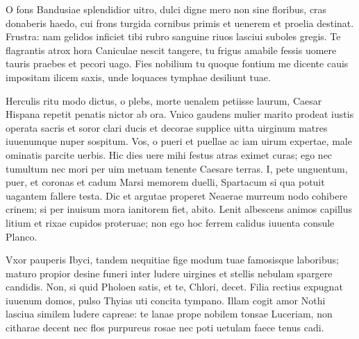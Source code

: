 \documentclass{book}
\newenvironment {carmen} [1] [\relax] 
  {\Titulus \Versus \incipit*\numerus{1}#1}
  {\endVersus}
\newcommand {\Sapphic}   {\Forma \strophae {0 \poena 00 \poena 1}}
\newcommand {\AsclB}     {\Forma \strophae {0 \poena 02 \poena 3}}
\newcommand {\GlycAscl}  {\Forma \strophae {2 \poena 0}}
\begin{document}
\begin{carmen}[\AsclB]


O fons Bandusiae splendidior uitro,
 dulci digne mero non sine floribus,
      cras donaberis haedo,
      cui frons turgida cornibus 
primis et uenerem et proelia destinat.               
 Frustra: nam gelidos inficiet tibi
      rubro sanguine riuos
      lasciui suboles gregis. 
Te flagrantis atrox hora Caniculae
 nescit tangere, tu frigus amabile               
      fessis uomere tauris
      praebes et pecori uago. 
Fies nobilium tu quoque fontium
 me dicente cauis impositam ilicem
      saxis, unde loquaces               
      tymphae desiliunt tuae. 

\end{carmen}

\begin{carmen}[\Sapphic]


Herculis ritu modo dictus, o plebs,
 morte uenalem petiisse laurum,
 Caesar Hispana repetit penatis
      nictor ab ora. 
Vnico gaudens mulier marito               
 prodeat iustis operata sacris
 et soror clari ducis et decorae
      supplice uitta 
uirginum matres iuuenumque nuper
 sospitum. Vos, o pueri et puellae ac               
 iam uirum expertae, male ominatis
      parcite uerbis. 
Hic dies uere mihi festus atras
 eximet curas; ego nec tumultum
 nec mori per uim metuam tenente               
      Caesare terras. 
I, pete unguentum, puer, et coronas
 et cadum Marsi memorem duelli,
 Spartacum si qua potuit uagantem
      fallere testa.                
Dic et argutae properet Neaerae
 murreum nodo cohibere crinem;
 si per inuisum mora ianitorem
      fiet, abito. 
Lenit albescens animos capillus               
 litium et rixae cupidos proteruae;
 non ego hoc ferrem calidus iuuenta
      consule Planco. 

\end{carmen}

\begin{carmen}[\GlycAscl]


     Vxor pauperis Ibyci,
 tandem nequitiae fige modum tuae
      famosisque laboribus;
 maturo propior desine funeri
      inter ludere uirgines               
 et stellis nebulam spargere candidis.
      Non, si quid Pholoen satis,
 et te, Chlori, decet. Filia rectius
      expugnat iuuenum domos,
 pulso Thyias uti concita tympano.               
      Illam cogit amor Nothi
 lasciua similem ludere capreae:
      te lanae prope nobilem
 tonsae Luceriam, non citharae decent
      nec flos purpureus rosae               
 nec poti uetulam faece tenus cadi. 

\end{carmen}
\end{document}
